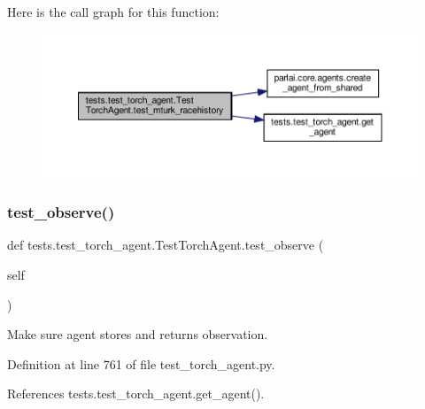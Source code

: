 Here is the call graph for this function\+:
\nopagebreak
\begin{figure}[H]
\begin{center}
\leavevmode
\includegraphics[width=350pt]{classtests_1_1test__torch__agent_1_1TestTorchAgent_a9954f92efc8cc7a9770f90f3a297d397_cgraph}
\end{center}
\end{figure}
\mbox{\label{classtests_1_1test__torch__agent_1_1TestTorchAgent_ae3b6e4145176ba5d5e9179756d064332}} 
\subsubsection{\texorpdfstring{test\+\_\+observe()}{test\_observe()}}
{\footnotesize\ttfamily def tests.\+test\+\_\+torch\+\_\+agent.\+Test\+Torch\+Agent.\+test\+\_\+observe (\begin{DoxyParamCaption}\item[{}]{self }\end{DoxyParamCaption})}

\begin{DoxyVerb}Make sure agent stores and returns observation.\end{DoxyVerb}
 

Definition at line 761 of file test\+\_\+torch\+\_\+agent.\+py.



References tests.\+test\+\_\+torch\+\_\+agent.\+get\+\_\+agent().

